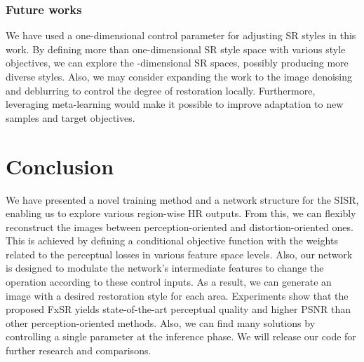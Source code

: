 \documentclass{article}
\begin{document}
\subsubsection{Future works}
We have used a one-dimensional control parameter  for adjusting SR styles in this work. By defining more than one-dimensional SR style space with various style objectives, we can explore the -dimensional SR spaces, possibly producing more diverse styles. Also, we may consider expanding the work to the image denoising and deblurring to control the degree of restoration locally. Furthermore, leveraging meta-learning would make it possible to improve adaptation to new samples and target objectives.

\section{Conclusion}
We have presented a novel training method and a network structure for the SISR, enabling us to explore various region-wise HR outputs. From this, we can flexibly reconstruct the images between perception-oriented and distortion-oriented ones. This is achieved by defining a conditional objective function with the weights related to the perceptual losses in various feature space levels. Also, our network is designed to modulate the network's intermediate features to change the operation according to these control inputs. As a result, we can generate an image with a desired restoration style for each area. Experiments show that the proposed FxSR yields state-of-the-art perceptual quality and higher PSNR than other perception-oriented methods. Also, we can find many solutions by controlling a single parameter at the inference phase. We will release our code for further research and comparisons.



\end{document}
